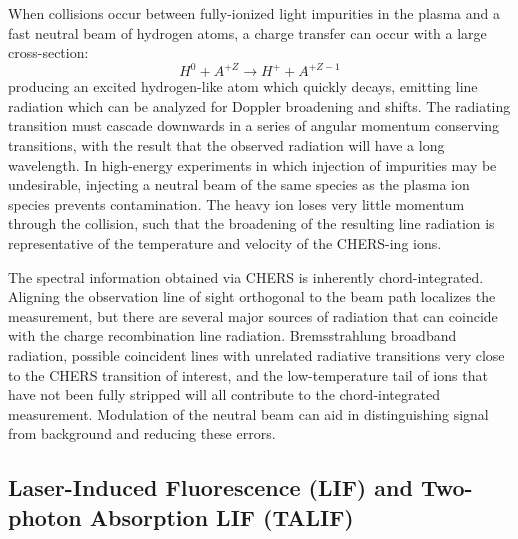 \documentclass{jpp}
\begin{document}
When collisions occur between fully-ionized light impurities in the plasma and a fast neutral beam of hydrogen atoms, a charge transfer can occur with a large cross-section:
\begin{equation*}
H^0 + A^{+Z} \rightarrow H^+ + A^{+Z - 1}
\end{equation*}
producing an excited hydrogen-like atom which quickly decays, emitting line radiation which can be analyzed for Doppler broadening and shifts. The radiating transition must cascade downwards in a series of angular momentum conserving transitions, with the result that the observed radiation will have a long wavelength. In high-energy experiments in which injection of impurities may be undesirable, injecting a neutral beam of the same species as the plasma ion species prevents contamination. The heavy ion loses very little momentum through the collision, such that the broadening of the resulting line radiation is representative of the temperature and velocity of the CHERS-ing ions.

The spectral information obtained via CHERS is inherently chord-integrated. Aligning the observation line of sight orthogonal to the beam path localizes the measurement, but there are several major sources of radiation that can coincide with the charge recombination line radiation. Bremsstrahlung broadband radiation, possible coincident lines with unrelated radiative transitions very close to the CHERS transition of interest, and the low-temperature tail of ions that have not been fully stripped will all contribute to the chord-integrated measurement. Modulation of the neutral beam can aid in distinguishing signal from background and reducing these errors.


\subsection{Laser-Induced Fluorescence (LIF) and Two-photon Absorption LIF (TALIF)}
\end{document}
